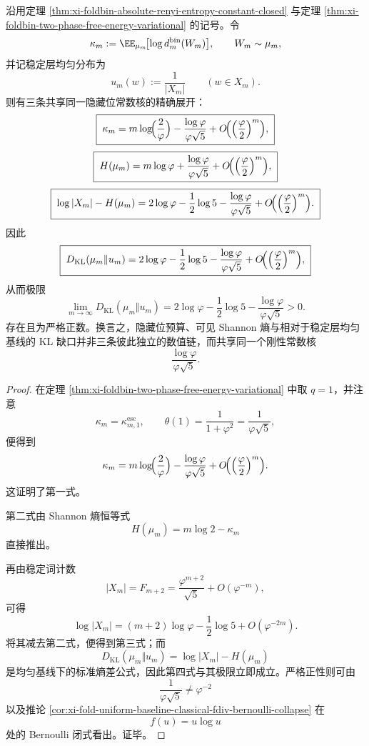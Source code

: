 \begin{theorem}\label{thm:xi-foldbin-hidden-budget-visible-entropy-kl-one-constant}
沿用定理 \ref{thm:xi-foldbin-absolute-renyi-entropy-constant-closed} 与定理
\ref{thm:xi-foldbin-two-phase-free-energy-variational} 的记号。令
\[
\kappa_m:=\EE_{\mu_m}\!\bigl[\log d_m^{\mathrm{bin}}(W_m)\bigr],
\qquad
W_m\sim\mu_m,
\]
并记稳定层均匀分布为
\[
u_m(w):=\frac{1}{|X_m|}
\qquad (w\in X_m).
\]
则有三条共享同一隐藏位常数核的精确展开：
\[
\boxed{\;
\kappa_m
=
m\log\!\Bigl(\frac{2}{\varphi}\Bigr)
-\frac{\log\varphi}{\varphi\sqrt5}
+O\!\Bigl(\Bigl(\frac{\varphi}{2}\Bigr)^m\Bigr),\;}
\]
\[
\boxed{\;
H(\mu_m)
=
m\log\varphi
+\frac{\log\varphi}{\varphi\sqrt5}
+O\!\Bigl(\Bigl(\frac{\varphi}{2}\Bigr)^m\Bigr),\;}
\]
\[
\boxed{\;
\log|X_m|-H(\mu_m)
=
2\log\varphi-\frac12\log5-\frac{\log\varphi}{\varphi\sqrt5}
+O\!\Bigl(\Bigl(\frac{\varphi}{2}\Bigr)^m\Bigr).\;}
\]
因此
\[
\boxed{\;
D_{\mathrm{KL}}(\mu_m\Vert u_m)
=
2\log\varphi-\frac12\log5-\frac{\log\varphi}{\varphi\sqrt5}
+O\!\Bigl(\Bigl(\frac{\varphi}{2}\Bigr)^m\Bigr),\;}
\]
从而极限
\[
\boxed{\;
\lim_{m\to\infty}D_{\mathrm{KL}}(\mu_m\Vert u_m)
=
2\log\varphi-\frac12\log5-\frac{\log\varphi}{\varphi\sqrt5}>0.\;}
\]
存在且为严格正数。换言之，隐藏位预算、可见 Shannon 熵与相对于稳定层均匀基线的 KL 缺口并非三条彼此独立的数值链，而共享同一个刚性常数核
\[
\frac{\log\varphi}{\varphi\sqrt5}.
\]
\end{theorem}
\begin{proof}
在定理 \ref{thm:xi-foldbin-two-phase-free-energy-variational} 中取 \(q=1\)，并注意
\[
\kappa_m=\kappa_{m,1}^{\mathrm{esc}},
\qquad
\theta(1)=\frac{1}{1+\varphi^2}=\frac{1}{\varphi\sqrt5},
\]
便得到
\[
\kappa_m
=
m\log\!\Bigl(\frac{2}{\varphi}\Bigr)
-\frac{\log\varphi}{\varphi\sqrt5}
+O\!\Bigl(\Bigl(\frac{\varphi}{2}\Bigr)^m\Bigr).
\]
这证明了第一式。

第二式由 Shannon 熵恒等式
\[
H(\mu_m)=m\log2-\kappa_m
\]
直接推出。

再由稳定词计数
\[
|X_m|=F_{m+2}
=
\frac{\varphi^{m+2}}{\sqrt5}+O(\varphi^{-m}),
\]
可得
\[
\log|X_m|
=
(m+2)\log\varphi-\frac12\log5+O(\varphi^{-2m}).
\]
将其减去第二式，便得到第三式；而
\[
D_{\mathrm{KL}}(\mu_m\Vert u_m)=\log|X_m|-H(\mu_m)
\]
是均匀基线下的标准熵差公式，因此第四式与其极限立即成立。严格正性则可由
\[
\frac{1}{\varphi\sqrt5}\neq \varphi^{-2}
\]
以及推论 \ref{cor:xi-fold-uniform-baseline-classical-fdiv-bernoulli-collapse} 在
\[
f(u)=u\log u
\]
处的 Bernoulli 闭式看出。证毕。
\end{proof}

